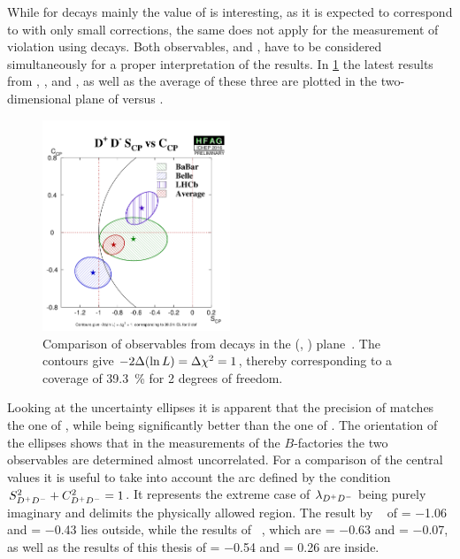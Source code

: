 While for \BdToJPsiKS decays mainly the value of \SJpsiKS is interesting, as
it is expected to correspond to \sintwobeta with only small corrections, the
same does not apply for the measurement of \CP violation using \BdToDD decays.
Both observables, \SDD and \CDD, have to be considered simultaneously for a
proper interpretation of the results. In \cref{fig:discussion:b2ddcomparison}
the latest results from \babar, \belle, and \lhcb, as well as the average of
these three are plotted in the two-dimensional plane of \CDD versus \SDD.
\begin{figure}[htb]
\centering
\includegraphics[width=0.5\textwidth]{08-Discussion/figs/D+D-S_CPvsC_CP.pdf}
\caption{Comparison of \CP observables from \mbox{\BdToDD} decays in the (\SDD,
\CDD) plane~\cite{HFAG}. The contours give $-2\Delta(\ln L) = \Delta\chi^2 =
1$, thereby corresponding to a coverage of \SI{39.3}{\percent} for 2 degrees
of freedom.}
\label{fig:discussion:b2ddcomparison}
\end{figure}
Looking at the uncertainty ellipses it is apparent that the precision of \lhcb
matches the one of \belle, while being significantly better than the one of
\babar. The orientation of the ellipses shows that in the measurements of the
$B$-factories the two \CP observables are determined almost uncorrelated. For
a comparison of the central values it is useful to take into account the arc
defined by the condition $S_{{{D}^+}{{D}^-}}^2+C_{{{D}^+}{{D}^-}}^2=1$. It represents the extreme case of
$\lambda_{{{D}^+}{{D}^-}}$ being purely imaginary and delimits the physically allowed
region. The result by \belle~\cite{Rohrken:2012ta} of \SDD = \num{-1.06} and
\CDD = \num{-0.43} lies outside, while the results of
\babar~\cite{Aubert:2008ah}, which are \SDD = \num{-0.63} and \CDD =
\num{-0.07}, as well as the results of this thesis of \SDD = \num{-0.54} and
\CDD = \num{0.26} are inside.
